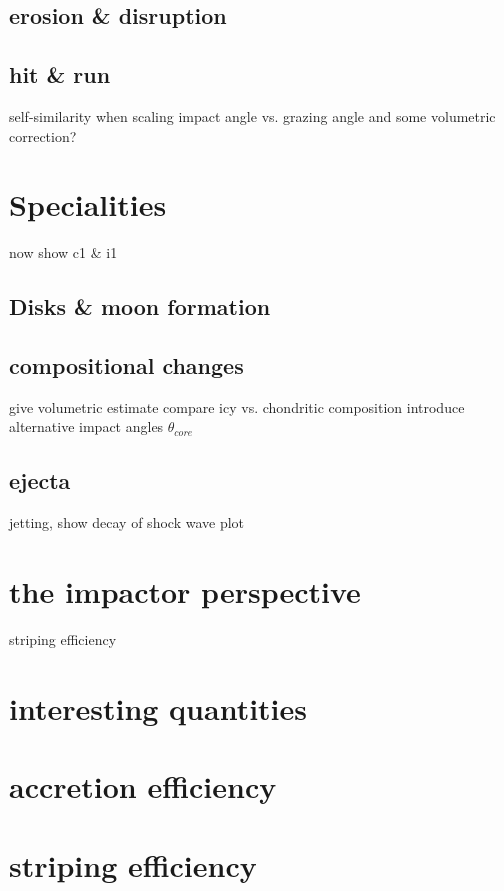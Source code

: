 \subsection{erosion \& disruption}
\subsection{hit \& run}


self-similarity when scaling impact angle vs. grazing angle and some volumetric correction?

\section{Specialities}
now show c1 \& i1
\subsection{Disks \& moon formation}

\subsection{compositional changes}
give volumetric estimate
compare icy vs. chondritic composition
introduce alternative impact angles $\theta_{core}$

\subsection{ejecta}
jetting, show decay of shock wave plot

\section{the impactor perspective}
striping efficiency


\section{interesting quantities}
\section{accretion efficiency}
\section{striping efficiency}

\cite{Chambers:2001p2105}
\citep{chandrasekhar1969ellipsoidal}
\cite{Lissauer:1993p56}
\cite{Wetherill:1993p3351}


